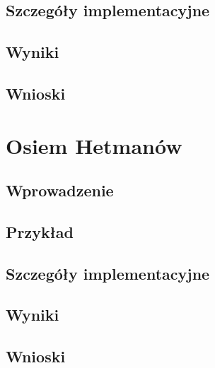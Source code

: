     \subsection{Szczegóły implementacyjne}
    \subsection{Wyniki}
    \subsection{Wnioski}
\section{Osiem Hetmanów}
\label{OsiemHetmanowTest}
    \subsection{Wprowadzenie}
    \subsection{Przykład}
    \subsection{Szczegóły implementacyjne}
    \subsection{Wyniki}
    \subsection{Wnioski}